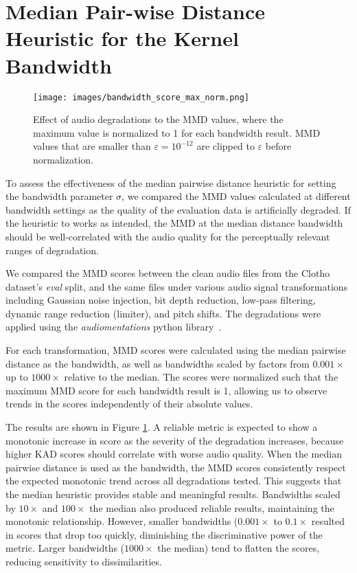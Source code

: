 

\section{Median Pair-wise Distance Heuristic for the Kernel Bandwidth}
\label{sec:appendix_bandwidth}

\begin{figure}[ht]
    \centering
    \texttt{[image: images/bandwidth\_score\_max\_norm.png]}
    \caption{Effect of audio degradations to the MMD values, where the maximum value is normalized to 1 for each bandwidth result. MMD values that are smaller than $\varepsilon=10^{-12}$ are clipped to $\varepsilon$ before normalization.}
    \label{fig:bandwidth_score_norm}
\end{figure}

To assess the effectiveness of the median pairwise distance heuristic for setting the bandwidth parameter $\sigma$, we compared the MMD values calculated at different bandwidth settings as the quality of the evaluation data is artificially degraded. If the heuristic to works as intended, the MMD at the median distance bandwidth should be well-correlated with the audio quality for the perceptually relevant ranges of degradation.

We compared the MMD scores between the clean audio files from the Clotho dataset's \textit{eval} split, and the same files under various audio signal transformations including Gaussian noise injection, bit depth reduction, low-pass filtering, dynamic range reduction (limiter), and pitch shifts. The degradations were applied using the \textit{audiomentations} python library~\cite{audiomentations}.

For each transformation, MMD scores were calculated using the median pairwise distance as the bandwidth, as well as bandwidths scaled by factors from $0.001 \times$ up to $1000 \times$ relative to the median. The scores were normalized such that the maximum MMD score for each bandwidth result is 1, allowing us to observe trends in the scores independently of their absolute values.

The results are shown in Figure \ref{fig:bandwidth_score_norm}. A reliable metric is expected to show a monotonic increase in score as the severity of the degradation increases, because higher KAD scores should correlate with worse audio quality. When the median pairwise distance is used as the bandwidth, the MMD scores consistently respect the expected monotonic trend across all degradations tested. This suggests that the median heuristic provides stable and meaningful results. Bandwidths scaled by $10 \times$ and $100 \times$ the median also produced reliable results, maintaining the monotonic relationship. However, smaller bandwidths ($0.001 \times$ to $0.1 \times$ resulted in scores that drop too quickly, diminishing the discriminative power of the metric. Larger bandwidths ($1000 \times$ the median) tend to flatten the scores, reducing sensitivity to dissimilarities.

